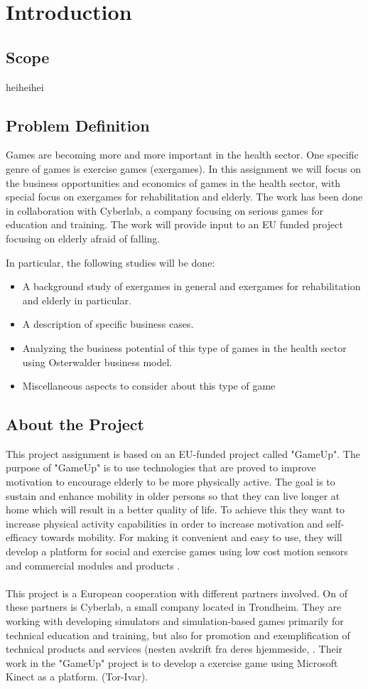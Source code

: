 \chapter{Introduction}
\section{Scope}
heiheihei
\section{Problem Definition}
Games are becoming more and more important in the health sector. One specific genre of games is exercise games (exergames). In this assignment we will focus on the business opportunities and economics of games in the health sector, with special focus on exergames for rehabilitation and elderly. The work has been done in collaboration with Cyberlab, a company focusing on serious games for education and training. The work will provide input to an EU funded project focusing on elderly afraid of falling.

In particular, the following studies will be done: 
\begin{itemize}
\renewcommand{\labelitemi}{$\bullet$}
\item A background study of exergames in general and exergames for rehabilitation and elderly in particular.
\item	A description of specific business cases.
\item	Analyzing the business potential of this type of games in the health sector using Osterwalder business model.
\item	Miscellaneous aspects to consider about this type of game
\end{itemize}

\section{About the Project}
This project assignment is based on an EU-funded project called "GameUp". The purpose of "GameUp" is to use technologies that are proved to improve motivation to encourage elderly to be more physically active. The goal is to sustain and enhance mobility in older persons so that they can live longer at home which will result in a better quality of life. To achieve this they want to increase physical activity capabilities in order to increase motivation and self-efficacy towards mobility. For making it convenient and easy to use, they will develop a platform for social and exercise games using low cost motion sensors and commercial modules and products \cite{gameup}.\\ \\ This project is a European cooperation with different partners involved. On of these partners is Cyberlab, a small company located in Trondheim. They are working with developing simulators and simulation-based games primarily for technical education and training, but also for promotion and exemplification of technical products and services (nesten avskrift fra deres hjemmeside, \cite{cyberlab}. Their work in the "GameUp" project is to develop a exercise game using Microsoft Kinect as a platform. (Tor-Ivar).


